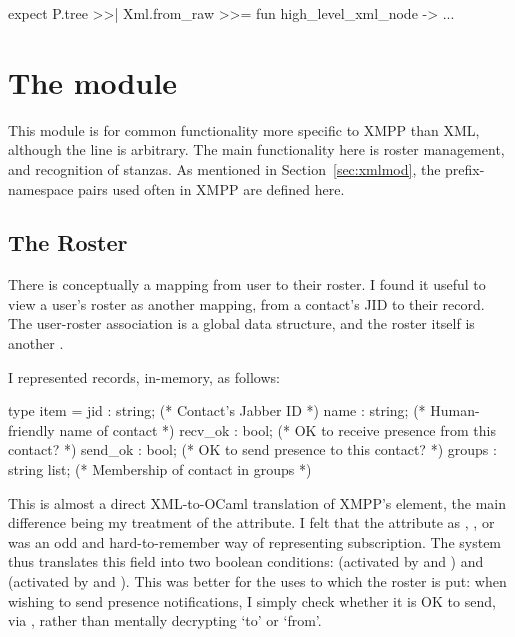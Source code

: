 \begin{ocaml}
expect P.tree >>| Xml.from_raw >>= fun high_level_xml_node -> ...
\end{ocaml}

\section{The  module}
This module is for common functionality more specific to XMPP than XML, although the line is arbitrary. The main functionality here is roster management, and recognition of stanzas. As mentioned in Section~\ref{sec:xmlmod}, the prefix-namespace pairs used often in XMPP are defined here.

\subsection{The Roster}
There is conceptually a mapping from user to their roster. I found it useful to view a user's roster as another mapping, from a contact's JID to their  record. The user-roster association is a global  data structure, and the roster itself is another .

I represented  records, in-memory, as follows:

\hspace*{-\parindent}%
\begin{minipage}{\linewidth}
  \begin{ocaml}
    type item = {
      jid     : string;        (* Contact's Jabber ID                       *)
      name    : string;        (* Human-friendly name of contact            *)
      recv_ok : bool;          (* OK to receive presence from this contact? *)
      send_ok : bool;          (* OK to send presence to this contact?      *)
      groups  : string list; (* Membership of contact in groups           *)
    }
  \end{ocaml}
\end{minipage}

This is almost a direct XML-to-OCaml translation of XMPP's  element, the main difference being my treatment of the  attribute. I felt that the  attribute as , ,  or  was an odd and hard-to-remember way of representing subscription. The system thus translates this field into two boolean conditions:  (activated by  and ) and  (activated by  and ). This was better for the uses to which the roster is put: when wishing to send presence notifications, I simply check whether it is OK to send, via , rather than mentally decrypting `to' or `from'.

